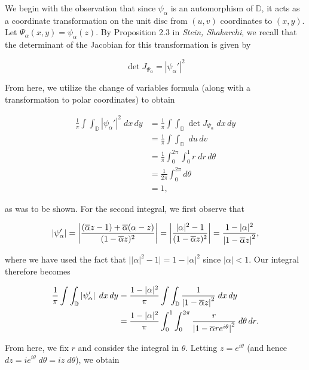 \begin{solution}
  We begin with the observation that since $\psi_{\alpha}$ is an automorphism of $\mathbb{D}$, it acts as a coordinate
  transformation on the unit disc from $(u, v)$ coordinates to $(x, y)$. Let $\Psi_{\alpha}(x, y) = \psi_{\alpha}(z)$. By 
  Proposition 2.3 in \textit{Stein, Shakarchi}, we recall that the determinant of the Jacobian for this transformation 
  is given by 
  
  $$\det{J_{\Psi_{\alpha}}} = |\psi_{\alpha}'|^2$$

  From here, we utilize the change of variables formula (along with a transformation to polar coordinates) to obtain

  \begin{align*}
    \frac{1}{\pi} \int\int_{\mathbb{D}} \left| \psi_{\alpha}' \right|^2 \; dx \, dy 
      &= \frac{1}{\pi} \int\int_{\mathbb{D}} \det{J_{\Psi_{\alpha}}} \; dx \, dy \\
      &= \frac{1}{\pi} \int\int_{\mathbb{D}} \; du \, dv \\
      &= \frac{1}{\pi} \int_0^{2 \pi}\int_0^1 r \; dr \, d\theta \\
      &= \frac{1}{2 \pi} \int_0^{2 \pi} d\theta \\
      &= 1,
  \end{align*}

  as was to be shown. For the second integral, we first observe that

  $$
  \left|\psi'_{\alpha}\right| = \left|\frac{(\overline{\alpha} z - 1) + \overline{\alpha}(\alpha - z)}{(1 - \overline{\alpha}z)^2}\right|
                              = \left| \frac{|\alpha|^2 - 1}{(1 - \overline{\alpha}z)^2} \right|
                              = \frac{1 - |\alpha|^2}{\left|1 - \overline{\alpha}z\right|^2},
  $$

  where we have used the fact that $\big\vert |\alpha|^2 - 1 \big\vert = 1 - |\alpha|^2$ since $|\alpha| < 1$. Our integral
  therefore becomes

  \begin{align*}
    \frac{1}{\pi} \int\int_{\mathbb{D}} \left| \psi_{\alpha}' \right| \; dx \, dy 
      &= \frac{1 - |\alpha|^2}{\pi} \int\int_{\mathbb{D}} \frac{1}{\left|1 - \overline{\alpha}z\right|^2} \; dx \, dy \\
      &= \frac{1 - |\alpha|^2}{\pi} \int_0^1 \int_0^{2 \pi}  \frac{r}{\left|1 - \overline{\alpha}re^{i\theta}\right|^2} \; d\theta \, dr.
  \end{align*}

  From here, we fix $r$ and consider the integral in $\theta$. Letting $z = e^{i \theta}$ (and hence 
  $dz = i e^{i \theta} \; d\theta = i z \; d\theta$), we obtain


\end{solution}

